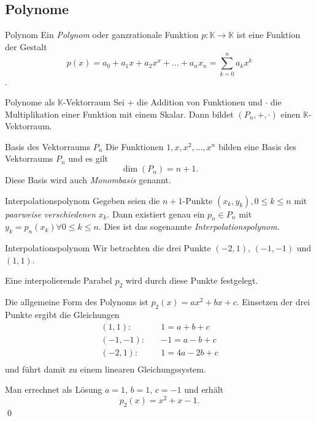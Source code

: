 \documentclass[german]{../spicker}
\begin{document}
\newpage
\subsection{Polynome}
\begin{defi}{Polynom}
    Ein \emph{Polynom} oder ganzrationale Funktion $p : \mathbb{K} \to \mathbb{K}$ ist eine Funktion der Gestalt
    $$
        p(x) = a_0 + a_1x + a_2x^x + \ldots + a_nx_n = \sum^n_{k=0} a_kx^k
    $$.
\end{defi}

\begin{bonus}{Polynome als $\mathbb{K}$-Vektorraum}
    Sei $+$ die Addition von Funktionen und $\cdot$ die Multiplikation einer Funktion mit einem Skalar. Dann bildet $(P_n, +, \cdot)$ einen $\mathbb{K}$-Vektorraum.
\end{bonus}

\begin{bonus}{Basis des Vektorraums $P_n$}
    Die Funktionen $1, x, x^2, \ldots, x^n$ bilden eine Basis des Vektorraums $P_n$ und es gilt
    $$
        \dim(P_n) = n + 1.
    $$
    Diese Basis wird auch \emph{Monombasis} genannt.
\end{bonus}

\begin{defi}{Interpolationspolynom}
    Gegeben seien die $n+1$-Punkte $(x_k, y_k), 0 \leq k \leq n$ mit \emph{paarweise verschiedenen} $x_k$.
    Dann existiert genau ein $p_n \in P_n$ mit $y_k = p_n(x_k) \forall 0 \leq k \leq n$.
    Dies ist das sogenannte \emph{Interpolationspolynom}.
\end{defi}

\begin{example}{Interpolationspolynom}
    Wir betrachten die drei Punkte $(-2, 1)$, $(-1, -1)$ und $(1, 1)$.

    Eine interpolierende Parabel $p_2$ wird durch diese Punkte festgelegt.

    Die allgemeine Form des Polynoms ist $p_2(x) = ax^2 + bx + c$.
    Einsetzen der drei Punkte ergibt die Gleichungen
    $$
        \begin{aligned}
            (1, 1): \quad   & 1 = a + b + c   \\
            (-1, -1): \quad & -1 = a - b + c  \\
            (-2, 1): \quad  & 1 = 4a - 2b + c \\
        \end{aligned}
    $$
    und führt damit zu einem linearen Gleichungssystem.

    Man errechnet als Lösung $a = 1$, $b = 1$, $c = -1$ und erhält
    $$
        p_2(x) = x^2 + x -1.
    $$\qed
\end{example}
\end{document}

